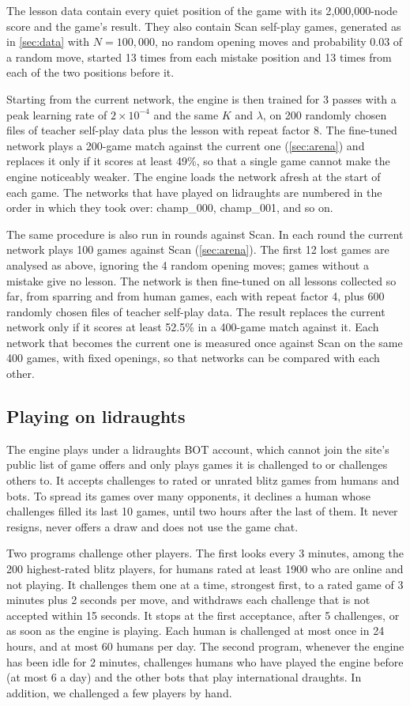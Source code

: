 The lesson data contain every quiet position of the game with its
2{,}000{,}000-node score and the game's result. They also contain Scan self-play
games, generated as in \cref{sec:data} with $N=100{,}000$, no random opening moves
and probability 0.03 of a random move, started 13 times from each mistake
position and 13 times from each of the two positions before it.

Starting from the current network, the engine is then trained for 3 passes with a
peak learning rate of $2\times10^{-4}$ and the same $K$ and $\lambda$, on 200
randomly chosen files of teacher self-play data plus the lesson with repeat
factor 8. The fine-tuned network plays a 200-game match against the current one
(\cref{sec:arena}) and replaces it only if it scores at least 49\%, so that a
single game cannot make the engine noticeably weaker. The engine loads the network
afresh at the start of each game. The networks that have played on lidraughts are
numbered in the order in which they took over: champ\_000, champ\_001, and so on.

The same procedure is also run in rounds against Scan. In each round the current
network plays 100 games against Scan (\cref{sec:arena}). The first 12 lost games
are analysed as above, ignoring the 4 random opening moves; games without a
mistake give no lesson. The network is then fine-tuned on all lessons collected
so far, from sparring and from human games, each with repeat factor 4, plus 600
randomly chosen files of teacher self-play data. The result replaces the current
network only if it scores at least 52.5\% in a 400-game match against it. Each
network that becomes the current one is measured once against Scan on the same
400 games, with fixed openings, so that networks can be compared with each other.

\subsection{Playing on lidraughts}\label{sec:deploy}

The engine plays under a lidraughts BOT account, which cannot join the site's
public list of game offers and only plays games it is challenged to or
challenges others to. It accepts challenges to rated or unrated blitz games from
humans and bots. To spread its games over many opponents, it declines a human
whose challenges filled its last 10 games, until two hours after the last of
them. It never resigns, never offers a draw and does not use the game chat.

Two programs challenge other players. The first looks every 3 minutes, among the
200 highest-rated blitz players, for humans rated at least 1900 who are online
and not playing. It challenges them one at a time, strongest first, to a rated
game of 3 minutes plus 2 seconds per move, and withdraws each challenge that is
not accepted within 15 seconds. It stops at the first acceptance, after 5
challenges, or as soon as the engine is playing. Each human is challenged at most
once in 24 hours, and at most 60 humans per day. The second program, whenever the
engine has been idle for 2 minutes, challenges humans who have played the engine
before (at most 6 a day) and the other bots that play international draughts. In
addition, we challenged a few players by hand.
